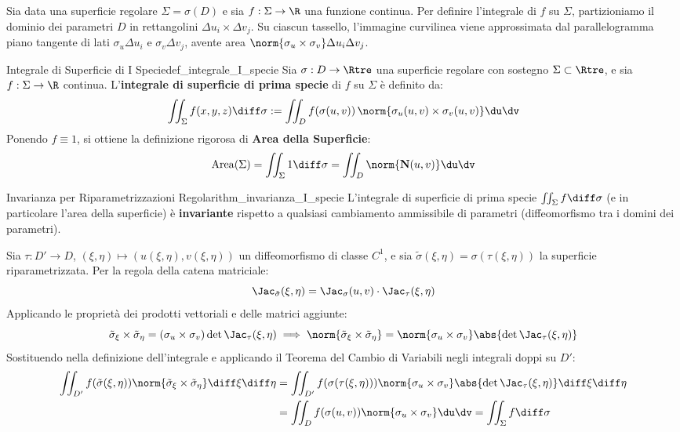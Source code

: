 Sia data una superficie regolare $\Sigma = \sigma(D)$ e sia $f: \Sigma \to \R$ una funzione continua. Per definire l'integrale di $f$ su $\Sigma$, partizioniamo il dominio dei parametri $D$ in rettangolini $\Delta u_i \times \Delta v_j$. Su ciascun tassello, l'immagine curvilinea viene approssimata dal parallelogramma piano tangente di lati $\sigma_u \Delta u_i$ e $\sigma_v \Delta v_j$, avente area $\norm{\sigma_u \times \sigma_v} \Delta u_i \Delta v_j$.

\begin{definizione}{Integrale di Superficie di I Specie}{def_integrale_I_specie}
Sia $\sigma: D \to \Rtre$ una superficie regolare con sostegno $\Sigma \subset \Rtre$, e sia $f: \Sigma \to \R$ continua. L'\textbf{integrale di superficie di prima specie} di $f$ su $\Sigma$ è definito da:
\[
\iint_\Sigma f(x,y,z) \diff\sigma := \iint_D f(\sigma(u,v)) \, \norm{\sigma_u(u,v) \times \sigma_v(u,v)} \du\dv
\]
Ponendo $f \equiv 1$, si ottiene la definizione rigorosa di \textbf{Area della Superficie}:
\[
\operatorname{Area}(\Sigma) = \iint_\Sigma 1 \diff\sigma = \iint_D \norm{\mathbf{N}(u,v)} \du\dv
\]
\end{definizione}

\begin{teorema}{Invarianza per Riparametrizzazioni Regolari}{thm_invarianza_I_specie}
L'integrale di superficie di prima specie $\iint_\Sigma f \diff\sigma$ (e in particolare l'area della superficie) è \textbf{invariante} rispetto a qualsiasi cambiamento ammissibile di parametri (diffeomorfismo tra i domini dei parametri).
\end{teorema}

\begin{dimostrazione}
Sia $\tau: D' \to D$, $(\xi, \eta) \mapsto (u(\xi, \eta), v(\xi, \eta))$ un diffeomorfismo di classe $C^1$, e sia $\tilde{\sigma}(\xi, \eta) = \sigma(\tau(\xi, \eta))$ la superficie riparametrizzata.
Per la regola della catena matriciale:
\[
\Jac_{\tilde{\sigma}}(\xi, \eta) = \Jac_\sigma(u,v) \cdot \Jac_\tau(\xi, \eta)
\]
Applicando le proprietà dei prodotti vettoriali e delle matrici aggiunte:
\[
\tilde{\sigma}_\xi \times \tilde{\sigma}_\eta = (\sigma_u \times \sigma_v) \det \Jac_\tau(\xi, \eta) \implies \norm{\tilde{\sigma}_\xi \times \tilde{\sigma}_\eta} = \norm{\sigma_u \times \sigma_v} \abs{\det \Jac_\tau(\xi, \eta)}
\]
Sostituendo nella definizione dell'integrale e applicando il Teorema del Cambio di Variabili negli integrali doppi su $D'$:
\begin{align*}
\iint_{D'} f(\tilde{\sigma}(\xi,\eta)) \norm{\tilde{\sigma}_\xi \times \tilde{\sigma}_\eta} \diff\xi\diff\eta &= \iint_{D'} f(\sigma(\tau(\xi,\eta))) \norm{\sigma_u \times \sigma_v} \abs{\det \Jac_\tau(\xi,\eta)} \diff\xi\diff\eta \\
&= \iint_D f(\sigma(u,v)) \norm{\sigma_u \times \sigma_v} \du\dv = \iint_\Sigma f \diff\sigma
\end{align*}
\end{dimostrazione}

